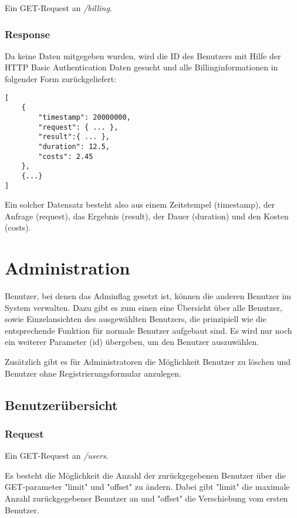 \documentclass[ngerman]{scrartcl}
\begin{document}
		Ein GET-Request an \textit{/billing}.
		
		\subsubsection*{Response}
		
		Da keine Daten mitgegeben wurden, wird die ID des Benutzers mit Hilfe der HTTP Basic Authentication Daten gesucht und alle Billinginformationen in folgender Form zurückgeliefert:
		
		\begin{lstlisting}
[
	{
		"timestamp": 20000000,
		"request": { ... },
		"result":{ ... },
		"duration": 12.5,
		"costs": 2.45
	},
	{...}
]
		\end{lstlisting}
		
		Ein solcher Datensatz besteht also aus einem Zeitstempel (timestamp), der Anfrage (request), das Ergebnis (result), der Dauer (duration) und den Kosten (costs).
	

\section{Administration}

Benutzer, bei denen das Adminflag gesetzt ist, können die anderen Benutzer im System verwalten. 
Dazu gibt es zum einen eine Übersicht über alle Benutzer, sowie Einzelansichten des ausgewählten Benutzers, die prinzipiell wie die entsprechende Funktion für normale Benutzer aufgebaut sind.
Es wird nur noch ein weiterer Parameter (id) übergeben, um den Benutzer auszuwählen.

Zusätzlich gibt es für Administratoren die Möglichkeit Benutzer zu löschen und Benutzer ohne Registrierungsformular anzulegen.

	\subsection{Benutzerübersicht}
	
		\subsubsection*{Request}
		
		Ein GET-Request an \textit{/users}.
		
		Es besteht die Möglichkeit die Anzahl der zurückgegebenen Benutzer über die GET-parameter "limit" und "offset" zu ändern. Dabei gibt "limit" die maximale Anzahl zurückgegebener Benutzer an und "offset" die Verschiebung vom ersten Benutzer.
		
\end{document}
